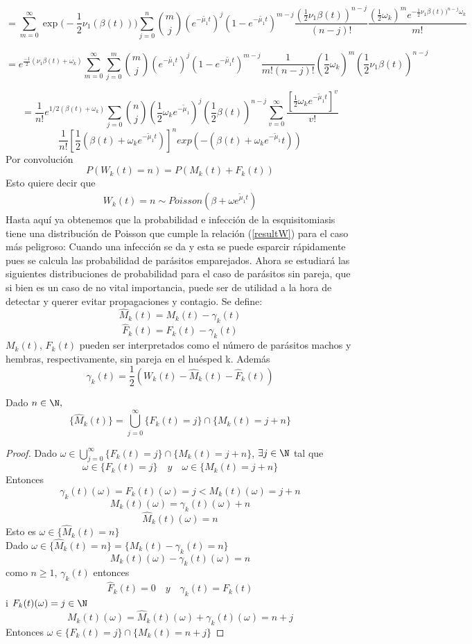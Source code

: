 $$=\sum_{m=0}^\infty\exp\bigg(-\frac{1}{2}\nu_1(\beta(t))\bigg)\sum_{j=0}^n{m \choose j}(e^{-\tilde{\mu_1}t})^j(1-e^{-\tilde{\mu_1}t})^{m-j}\frac{(\frac{1}{2}\nu_1\beta(t))^{n-j}}{(n-j)!}\frac{(\frac{1}{2}\omega_k)^m e^{-\frac{1}{2}\nu_1\beta(t))^{n-j}\omega_k}}{m!}$$ 

$$=e^{\frac{-1}{2}(\nu_1\beta(t)+\omega_k)}\sum_{m=0}^\infty\sum_{j=0}^m{m \choose j}(e^{-\tilde{\mu_1}t})^j(1-e^{-\tilde{\mu_1}t})^{m-j}\frac{1}{m!(n-j)!}(\frac{1}{2}\omega_k)^m(\frac{1}{2}\nu_1\beta(t))^{n-j}$$

$$=\frac{1}{n!}e^{1/2(\beta(t)+\omega_k)} \sum_{j=0}{n\choose j}(\frac{1}{2}\omega_k e^{-\tilde{\mu}_1})^j(\frac{1}{2}\beta(t))^{n-j}\sum_{v=0}^\infty\frac{[\frac{1}{2}\omega_k e^{-\tilde{\mu}_1t}]^v}{v!}  $$
$$\frac{1}{n!}[\frac{1}{2}(\beta(t)+\omega_k e^{-\tilde{\mu}_1t})]^n exp(-(\beta(t)+\omega_k e^{-\tilde{\mu}_1}t) ) $$
Por convolución $$P(W_k(t)=n)=P(M_k(t)+F_k(t))$$
Esto quiere decir que 
\begin{eqnarray}
\label{resultW}
    W_k(t)=n\sim Poisson(\beta+\omega e^{\tilde{\mu}_1 t})
\end{eqnarray}
Hasta aquí ya obtenemos que la probabilidad e infección de la esquisitomiasis tiene una distribución de Poisson que cumple la relación (\ref{resultW}) para el caso más peligroso: Cuando una infección se da y esta se puede esparcir rápidamente pues se calcula las probabilidad de parásitos emparejados.
Ahora se estudiará las siguientes distribuciones de probabilidad para el caso de parásitos sin pareja, que si bien es un caso de no vital importancia, puede ser de utilidad a la hora de detectar y querer evitar propagaciones y contagio.
Se define: $$\hat{M}_k(t)=M_k(t)-\gamma_k(t)$$
$$\hat{F}_k(t)=F_k(t)-\gamma_k(t)$$
$M_k(t)$, $F_k(t)$ pueden ser interpretados como el número de parásitos machos y hembras, respectivamente, sin pareja en el huésped k.
Además $$\gamma_k(t)=\frac{1}{2}(W_k(t)-\hat{M}_k(t)-\hat{F}_k(t) )$$
\begin{Lem}
    Dado $n\in\N,$
    $$\{\hat{M}_k(t)\}=\bigcup_{j=0}^\infty \{F_k(t)=j\}\cap\{M_k(t)=j+n\}$$
    \begin{proof}
        Dado $\omega\in\bigcup_{j=0}^\infty \{F_k(t)=j\}\cap\{M_k(t)=j+n\}$, $\exists j\in\N$ tal que $$\omega\in\{F_k(t)=j\}\quad y \quad\omega\in\{M_k(t)=j+n\}$$
        Entonces $$\gamma_k(t)(\omega)=F_k(t)(\omega)=j<M_k(t)(\omega)=j+n$$
        $$M_k(t)(\omega)=\gamma_k(t)(\omega)+n$$
        $$\hat{M}_k(t)(\omega)=n$$
        Esto es $\omega\in\{\hat{M}_k(t)=n\}$\\
        Dado $\omega\in\{\hat{M}_k(t)=n\}=\{M_k(t)-\gamma_k(t)=n\}$\\$$M_k(t)(\omega)-\gamma_k(t)(\omega)=n$$
        como $n\geq 1$, $\gamma_k(t)$ entonces $$\hat{F}_k(t)=0\quad y \quad \gamma_k(t)=F_k(t)$$
        i $F_k(t)(\omega)=j\in\N$
        $$M_k(t)(\omega)=\hat{M}_k(t)(\omega)+\gamma_k(t)(\omega)=n+j$$
        Entonces $\omega\in\{F_k(t)=j\}\cap\{M_k(t)=n+j\}$
    \end{proof}
\end{Lem}
